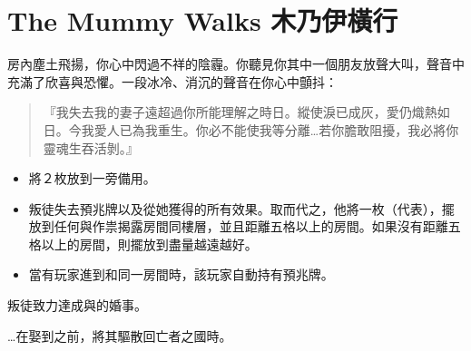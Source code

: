
\chapter{The Mummy Walks 木乃伊橫行}

\begin{HauntStory}
  房內塵土飛揚，你心中閃過不祥的陰霾。你聽見你其中一個朋友放聲大叫，聲音中充滿了欣喜與恐懼。一段冰冷、消沉的聲音在你心中顫抖：
  \begin{quote}
    『我失去我的妻子遠超過你所能理解之時日。縱使淚已成灰，愛仍熾熱如日。今我愛人已為我重生。你必不能使我等分離…若你膽敢阻擾，我必將你靈魂生吞活剝。』
  \end{quote}
\end{HauntStory}

\vspace*{-1em}
\begin{itemize}
  \item 將２枚放到一旁備用。
  \item 叛徒失去預兆牌以及從她獲得的所有效果。取而代之，他將一枚（代表），擺放到任何與作祟揭露房間同樓層，並且距離五格以上的房間。如果沒有距離五格以上的房間，則擺放到盡量越遠越好。
  \item 當有玩家進到和同一房間時，該玩家自動持有預兆牌。
\end{itemize}


叛徒致力達成與的婚事。


…在娶到之前，將其驅散回亡者之國時。

\vfill\null\pagebreak

